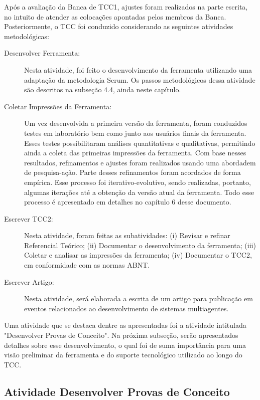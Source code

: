 Após a avaliação da Banca de TCC1, ajustes foram realizados na parte escrita, no intuito de atender as colocações apontadas pelos membros da Banca. Posteriormente, o TCC foi conduzido considerando as seguintes atividades metodológicas:

\begin{description}
\item [Desenvolver Ferramenta:]
Nesta atividade, foi feito o desenvolvimento da ferramenta utilizando uma adaptação da metodologia Scrum. Os passos metodológicos dessa atividade são descritos na subseção 4.4, ainda neste capítulo.

\item [Coletar Impressões da Ferramenta:]
Um vez desenvolvida a primeira versão da ferramenta, foram conduzidos testes em laboratório bem como junto aos usuários finais da ferramenta. Esses testes possibilitaram análises quantitativas e qualitativas, permitindo ainda a coleta das primeiras impressões da ferramenta. Com base nesses resultados, refinamentos e ajustes foram realizados usando uma abordadem de pesquisa-ação. Parte desses refinamentos foram acordados de forma empírica. Esse processo foi iterativo-evolutivo, sendo realizadas, portanto, algumas iterações até a obtenção da versão atual da ferramenta. Todo esse processo é apresentado em detalhes no capítulo 6 desse documento.

\item [Escrever TCC2:] 
Nesta atividade, foram feitas as subatividades: (i) Revisar e refinar Referencial Teórico; (ii) Documentar o desenvolvimento da ferramenta; (iii) Coletar e analisar as impressões da ferramenta; (iv) Documentar o TCC2, em conformidade com as normas ABNT.

\item [Escrever Artigo:]
Nesta atividade, será elaborada a escrita de um artigo para publicação em eventos relacionados ao desenvolvimento de sistemas multiagentes.
\end{description}

Uma atividade que se destaca dentre as apresentadas foi a atividade intitulada "Desenvolver Provas de Conceito".
Na próxima subseção, serão apresentados detalhes sobre esse desenvolvimento, o qual foi de suma importância para uma visão preliminar da ferramenta e do suporte tecnológico utilizado ao longo do TCC.


\subsection{Atividade Desenvolver Provas de Conceito}

